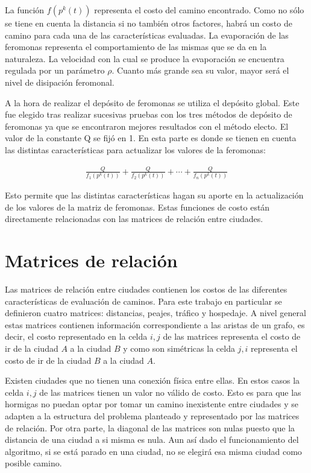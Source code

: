 \documentclass[conference,a4paper,10pt,oneside,final]{tfmpd}
\begin{document}
La función $f(p^{k}(t))$ representa el costo del camino encontrado. Como no sólo se tiene en cuenta la distancia si no también otros factores, habrá un costo de camino para cada una de las características evaluadas. La evaporación de las feromonas representa el comportamiento de las mismas que se da en la naturaleza. La velocidad con la cual se produce la evaporación se encuentra regulada por un parámetro $\rho$. Cuanto más grande sea su valor, mayor será el nivel de disipación feromonal.

A la hora de realizar el depósito de feromonas se utiliza el depósito global. Este fue elegido tras realizar sucesivas pruebas con los tres métodos de depósito de feromonas ya que se encontraron mejores resultados con el método electo. El valor de la constante Q se fijó en 1. En esta parte es donde se tienen en cuenta las distintas características para actualizar los valores de la feromonas:

\begin{align*}
\frac{Q}{f_{1}(p^{k}(t))}+\frac{Q}{f_{2}(p^{k}(t))}+\cdots+\frac{Q}{f_{n}(p^{k}(t))}
\end{align*}

Esto permite que las distintas características hagan su aporte en la actualización de los valores de la matriz de feromonas. Estas funciones de costo están directamente relacionadas con las matrices de relación entre ciudades.

\section{Matrices de relación}

Las matrices de relación entre ciudades contienen los costos de las diferentes características de evaluación de caminos. Para este trabajo en particular se definieron cuatro matrices: distancias, peajes, tráfico y hospedaje.
A nivel general estas matrices contienen información correspondiente a las aristas de un grafo, es decir, el costo representado en la celda $i,j$ de las matrices representa el costo de ir de la ciudad $A$ a la ciudad $B$ y como son simétricas la celda $j,i$ representa el costo de ir de la ciudad $B$ a la ciudad $A$.

Existen ciudades que no tienen una conexión física entre ellas. En estos casos la celda $i,j$ de las matrices tienen un valor no válido de costo. Esto es para que las hormigas no puedan optar por tomar un camino inexistente entre ciudades y se adapten a la estructura del problema planteado y representado por las matrices de relación. Por otra parte, la diagonal de las matrices son nulas puesto que la distancia de una ciudad a si misma es nula. Aun así dado el funcionamiento del algoritmo, si se está parado en una ciudad, no se elegirá esa misma ciudad como posible camino.
\end{document}
